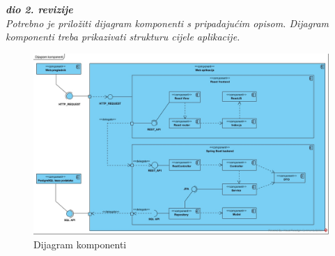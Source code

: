 \textbf{\textit{dio 2. revizije}}\\

\textit{Potrebno je priložiti dijagram komponenti s pripadajućim opisom. Dijagram komponenti treba prikazivati strukturu cijele aplikacije.}

\begin{figure}[H]
	\includegraphics[scale=0.40]{slike/DK.jpg} %
	\centering
	\caption{Dijagram komponenti}
	\label{fig:DijagramKomponenti}
\end{figure}